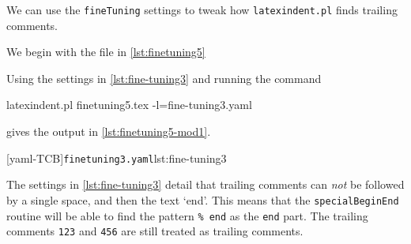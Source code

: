 \documentclass[10pt]{article}
\begin{document}
 \begin{example}
 We can use the \texttt{fineTuning} settings to tweak how \texttt{latexindent.pl} finds
 trailing comments. 

 We begin with the file in \cref{lst:finetuning5}


 Using the settings in \cref{lst:fine-tuning3} and running the command

 \begin{commandshell}
latexindent.pl finetuning5.tex -l=fine-tuning3.yaml
\end{commandshell}

 gives the output in \cref{lst:finetuning5-mod1}.

 \begin{cmhtcbraster}[raster column skip=.01\linewidth]
  [yaml-TCB]{\texttt{finetuning3.yaml}}{lst:fine-tuning3}
 \end{cmhtcbraster}

 The settings in \cref{lst:fine-tuning3} detail that trailing comments can \emph{not} be
 followed by a single space, and then the text `end'. This means that the
 \texttt{specialBeginEnd} routine will be able to find the pattern \lstinline!% end! as
 the \texttt{end} part. The trailing comments \texttt{123} and \texttt{456} are still
 treated as trailing comments.
 \end{example}
\end{document}
